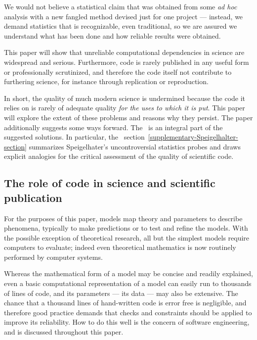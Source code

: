 We would not believe a statistical claim that was obtained from some \emph{ad hoc\/} analysis with a new fangled method devised just for one project --- instead, we demand statistics that is recognizable, even traditional, so we are assured we understand what has been done and how reliable results were obtained. 

This paper will show that unreliable computational dependencies in science are widespread and serious. Furthermore, code is rarely published in any useful form or professionally scrutinized, and therefore the code itself not contribute to furthering science, for instance through replication or reproduction. 

In short, the quality of much modern science is undermined because the code it relies on is rarely of adequate quality \emph{for the uses to which it is put}. This paper will explore the extent of these problems and reasons why they persist. The paper additionally suggests some ways forward. The \supplement\ is an integral part of the suggested solutions. In particular, the \supplement\ section~\ref{supplementary-Speigelhalter-section} summarizes Speigelhater's uncontroversial statistics probes and draws explicit analogies for the critical assessment of the quality of scientific code.

\subsection{The role of code in science and scientific publication}

For the purposes of this paper, models map theory and parameters to describe phenomena, typically to make predictions or to test and refine the models. With the possible exception of theoretical research, all but the simplest models require computers to evaluate; indeed even theoretical mathematics is now routinely performed by computer systems.

Whereas the mathematical form of a model may be concise and readily explained, even a basic computational representation of a model can easily run to thousands of lines of code, and its parameters --- its data --- may also be extensive. The chance that a thousand lines of hand-written code is error free is negligible, and therefore good practice demands that checks and constraints should be applied to improve its reliability. How to do this well is the concern of software engineering, and is discussed throughout this paper. 

